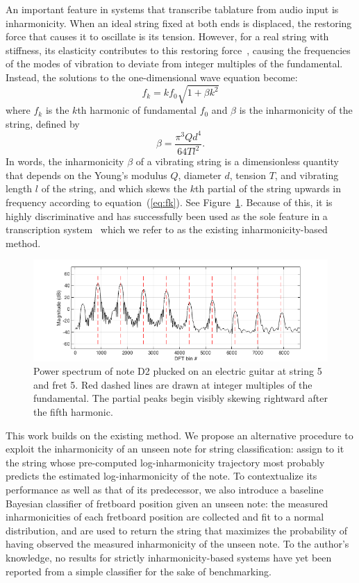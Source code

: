 \documentclass[convention,peer-reviewed]{aesconf}
\begin{document}
An important feature in systems that transcribe tablature from audio input is inharmonicity. When an ideal string fixed at both ends is displaced, the restoring force that causes it to oscillate is its tension. However, for a real string with stiffness, its elasticity contributes to this restoring force~\cite{fletcher1962}, causing the frequencies of the modes of vibration to deviate from integer multiples of the fundamental. Instead, the solutions to the one-dimensional wave equation become: 
\begin{equation}
\label{eq:fk}
f_k = kf_{0}\sqrt{1+\beta k^2}
\end{equation}
where $f_k$ is the $k$th harmonic of fundamental $f_0$ and $\beta$ is the inharmonicity of the string, defined by
\begin{equation}
\beta = \frac{\pi^3 Q d^4}{64 T l^2}. \label{eq:beta}
\end{equation}
In words, the inharmonicity $\beta$ of a vibrating string is a dimensionless quantity that depends on the Young's modulus $Q$, diameter $d$, tension $T$, and vibrating length $l$ of the string, and which skews the $k$th partial of the string upwards in frequency according to equation~(\ref{eq:fk}). See Figure~\ref{fig:skew}. Because of this, it is highly discriminative and has successfully been used as the sole feature in a transcription system~\cite{barbanchoi2012} which we refer to as the existing inharmonicity-based method.
\begin{figure}[!htbp]
\centering
\includegraphics[scale=0.3]{skew}
\caption{Power spectrum of note D2 plucked on an electric guitar at string 5 and fret 5. Red dashed lines are drawn at integer multiples of the fundamental. The partial peaks begin visibly skewing rightward after the fifth harmonic.}
\label{fig:skew}
\end{figure}

This work builds on the existing method. We propose an alternative procedure to exploit the inharmonicity of an unseen note for string classification: assign to it the string whose pre-computed log-inharmonicity trajectory most probably predicts the estimated log-inharmonicity of the note. To contextualize its performance as well as that of its predecessor, we also introduce a baseline Bayesian classifier of fretboard position given an unseen note: the measured inharmonicities of each fretboard position are collected and fit to a normal distribution, and are used to return the string that maximizes the probability of having observed the measured inharmonicity of the unseen note. To the author's knowledge, no results for strictly inharmonicity-based systems have yet been reported from a simple classifier for the sake of benchmarking. 
\end{document}
